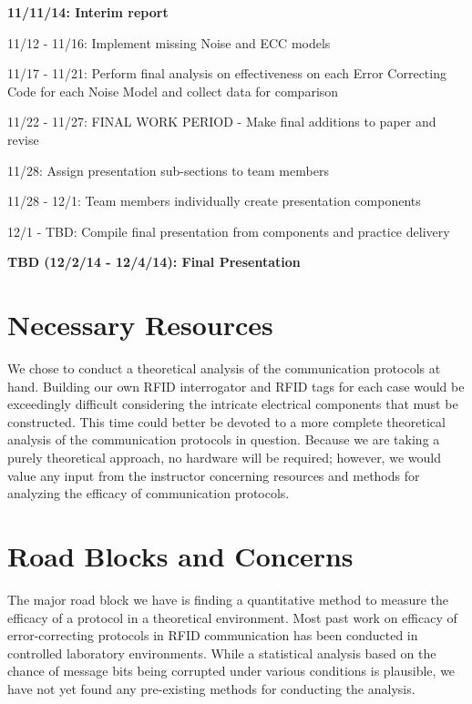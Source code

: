 \documentclass{sigcomm-alternate}
\begin{document}
\textbf{11/11/14: Interim report}

11/12 - 11/16: Implement missing Noise and ECC models

11/17 - 11/21: Perform final analysis on effectiveness on each Error Correcting Code for each Noise Model and collect data for comparison

11/22 - 11/27: FINAL WORK PERIOD - Make final additions to paper and revise

11/28: Assign presentation sub-sections to team members

11/28 - 12/1: Team members individually create presentation components

12/1 - TBD: Compile final presentation from components and practice delivery

\textbf{TBD (12/2/14 - 12/4/14): Final Presentation}


\section{Necessary Resources}
We chose to conduct a theoretical analysis of the communication protocols at hand. Building our own RFID interrogator and RFID tags for each case would be exceedingly difficult considering the intricate electrical components that must be constructed. This time could better be devoted to a more complete theoretical analysis of the communication protocols in question.  Because we are taking a purely theoretical approach, no hardware will be required; however, we would value any input from the instructor concerning resources and methods for analyzing the efficacy of communication protocols.

\section{Road Blocks and Concerns}
The major road block we have is finding a quantitative method to measure the efficacy of a protocol in a theoretical environment. Most past work on efficacy of error-correcting protocols in RFID communication has been conducted in controlled laboratory environments. While a statistical analysis based on the chance of message bits being corrupted under various conditions is plausible, we have not yet found any pre-existing methods for conducting the analysis.

\nocite{*}

 

\balancecolumns
\end{document}
